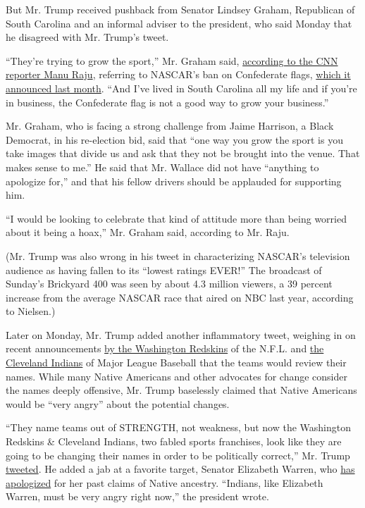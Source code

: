 But Mr. Trump received pushback from Senator Lindsey Graham, Republican
of South Carolina and an informal adviser to the president, who said
Monday that he disagreed with Mr. Trump's tweet.

``They're trying to grow the sport,'' Mr. Graham said,
\href{https://twitter.com/mkraju/status/1280165407740104709}{according
to the CNN reporter Manu Raju}, referring to NASCAR's ban on Confederate
flags,
\href{https://www.nytimes.com/2020/06/10/sports/autoracing/nascar-confederate-flags.html?searchResultPosition=1}{which
it announced last month}. ``And I've lived in South Carolina all my life
and if you're in business, the Confederate flag is not a good way to
grow your business.''

Mr. Graham, who is facing a strong challenge from Jaime Harrison, a
Black Democrat, in his re-election bid, said that ``one way you grow the
sport is you take images that divide us and ask that they not be brought
into the venue. That makes sense to me.'' He said that Mr. Wallace did
not have ``anything to apologize for,'' and that his fellow drivers
should be applauded for supporting him.

``I would be looking to celebrate that kind of attitude more than being
worried about it being a hoax,'' Mr. Graham said, according to Mr. Raju.

(Mr. Trump was also wrong in his tweet in characterizing NASCAR's
television audience as having fallen to its ``lowest ratings EVER!'' The
broadcast of Sunday's Brickyard 400 was seen by about 4.3 million
viewers, a 39 percent increase from the average NASCAR race that aired
on NBC last year, according to Nielsen.)

Later on Monday, Mr. Trump added another inflammatory tweet, weighing in
on recent announcements
\href{https://www.nytimes.com/2020/07/03/sports/football/washington-redskins-nickname-nfl.html}{by
the Washington Redskins} of the N.F.L. and
\href{https://www.nytimes.com/2020/07/03/sports/baseball/cleveland-indians-name-change.html}{the
Cleveland Indians} of Major League Baseball that the teams would review
their names. While many Native Americans and other advocates for change
consider the names deeply offensive, Mr. Trump baselessly claimed that
Native Americans would be ``very angry'' about the potential changes.

``They name teams out of STRENGTH, not weakness, but now the Washington
Redskins \& Cleveland Indians, two fabled sports franchises, look like
they are going to be changing their names in order to be politically
correct,'' Mr. Trump
\href{https://www.nytimes.com/2020/07/06/sports/football/washington-team-name-change.html}{tweeted}.
He added a jab at a favorite target, Senator Elizabeth Warren, who
\href{https://www.nytimes.com/2019/08/19/us/politics/elizabeth-warren-native-american.html}{has
apologized} for her past claims of Native ancestry. ``Indians, like
Elizabeth Warren, must be very angry right now,'' the president wrote.

